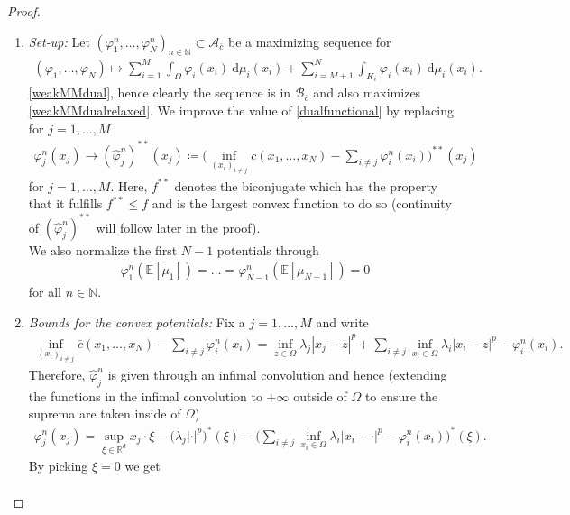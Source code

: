 \documentclass[letterpaper]{amsart}
\newcommand{\RR}{\mathbb{R}}
\newcommand{\NN}{\mathbb{N}}
\newcommand{\EE}{\mathbb{E}}
\newcommand{\dd}{\mathrm{d}}
\theoremstyle{definition}
\begin{document}
\begin{proof}

	\setdefaultleftmargin{0pt}{}{}{}{}{}
	\begin{enumerate}
	\item \textit{Set-up:}
	Let $(\varphi_1^n,\dots,\varphi_N^n)_{n\in\NN}\subset\mathcal A_{\bar c}$ be a maximizing sequence for
	\begin{gather}\label{dualfunctional}
		(\varphi_1,\dots,\varphi_N)\mapsto \sum_{i=1}^M\int_\Omega\varphi_i(x_i)\ \dd\mu_i(x_i)+\sum_{i=M+1}^N\int_{K_i}\varphi_i(x_i)\ \dd\mu_i(x_i).
	\end{gather}
	\eqref{weakMMdual}, hence clearly the sequence is in $\mathcal B_{\bar c}$ and also maximizes \eqref{weakMMdualrelaxed}.
	We improve the value of \eqref{dualfunctional} by replacing for $j=1,\dots,M$
	\begin{gather*}
		\varphi_j^n(x_j)\rightarrow (\hat\varphi_j^{n})^{**}(x_j)\coloneqq\Big(\inf_{(x_i)_{i\neq j}}\bar c(x_1,\dots,x_N)-\sum_{i\neq j}\varphi_i^n(x_i)\Big)^{**}(x_j)
	\end{gather*}
	for $j=1,\dots,M$. Here, $f^{**}$ denotes the biconjugate which has the property that it fulfills $f^{**}\leq f$ and is the largest convex function to do so (continuity of $(\hat\varphi_j^n)^{**}$ will follow later in the proof).\\
	We also normalize the first $N-1$ potentials through
	\begin{gather*}
		\varphi_1^n(\EE[\mu_1])=\dots=\varphi_{N-1}^n(\EE[\mu_{N-1}])=0
	\end{gather*}
	for all $n\in\NN$.
	\item \textit{Bounds for the convex potentials:}
	Fix a $j=1,\dots,M$ and write
	\begin{gather*}
		\inf_{(x_i)_{i\neq j}}\bar c(x_1,\dots,x_N)-\sum_{i\neq j}\varphi_i^n(x_i)=\inf_{z\in\Omega}\lambda_j|x_j-z|^p+\sum_{i\neq j}\inf_{x_i\in\Omega}\lambda_i|x_i-z|^p-\varphi_i^n(x_i).
	\end{gather*}
	Therefore, $\hat\varphi_j^n$ is given through an infimal convolution and hence (extending the functions in the infimal convolution to $+\infty$ outside of $\Omega$ to ensure the suprema are taken inside of $\Omega$)
	\begin{gather*}
		\varphi_j^n(x_j)=\sup_{\xi\in\RR^d}x_j\cdot\xi-\big(\lambda_j|\cdot|^p\big)^*(\xi)-\Big(\sum_{i\neq j}\inf_{x_i\in\Omega}\lambda_i|x_i-\cdot|^p-\varphi_i^n(x_i)\Big)^*(\xi).
	\end{gather*}
	By picking $\xi=0$ we get
	\begin{align*}

\end{align*}
\end{enumerate}
\end{proof}
\end{document}
